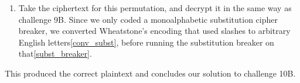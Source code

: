 \begin{enumerate}[resume]
    \item Take the ciphertext for this permutation, and decrypt it in the same way as challenge 9B. Since we only coded a monoalphabetic substitution cipher breaker, we converted Wheatstone's encoding that used slashes to arbitrary English letters\cref{conv_subst}, before running the substitution breaker on that\cref{subst_breaker}.
\end{enumerate}

This produced the correct plaintext and concludes our solution to challenge 10B.